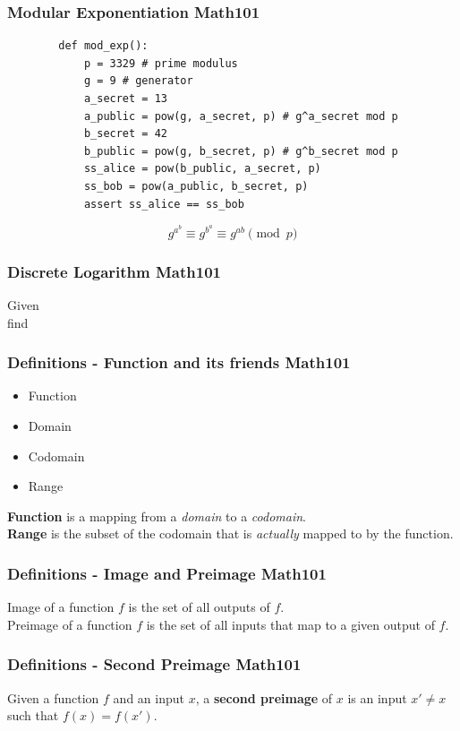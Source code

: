\documentclass[12pt]{beamer}
\newcommand{\FrameTitle}[2]{\frametitle{#1 \hfill \small\textnormal{\textcolor{midgray}{#2}}}}
\newcommand{\nl}{\vspace*{1em}\\}
\begin{document}
\begin{frame}[fragile]\FrameTitle{Modular Exponentiation}{Math101}
    \begin{lstlisting}
        def mod_exp():
            p = 3329 # prime modulus
            g = 9 # generator
            a_secret = 13
            a_public = pow(g, a_secret, p) # g^a_secret mod p
            b_secret = 42
            b_public = pow(g, b_secret, p) # g^b_secret mod p
            ss_alice = pow(b_public, a_secret, p)
            ss_bob = pow(a_public, b_secret, p)
            assert ss_alice == ss_bob
    \end{lstlisting}

    {\Large
    $$
        g^{a^{b}} \equiv g^{b^{a}} \equiv g^{ab}  \pmod{p}
    $$
    }
\end{frame}

\begin{frame}\FrameTitle{Discrete Logarithm}{Math101}
    {\huge
    Given
     \nl
    find \color{Apricot}{$a$}
    }
\end{frame}

\begin{frame}\FrameTitle{Definitions - Function and its friends}{Math101}
    \begin{itemize}
        \item[] Function
        \item[] Domain
        \item[] Codomain
        \item[] Range
    \end{itemize}

    \textbf{Function} is a mapping from a \textit{domain} to a \textit{codomain}.\nl
    \textbf{Range} is the subset of the codomain that is \textit{actually} mapped to by the function.
\end{frame}

\begin{frame}\FrameTitle{Definitions - Image and Preimage}{Math101}
    Image of a function $f$ is the set of all outputs of $f$.\nl
    Preimage of a function $f$ is the set of all inputs that map to a given output of $f$.
\end{frame}

\begin{frame}\FrameTitle{Definitions - Second Preimage}{Math101}
    Given a function $f$ and an input $x$, a \textbf{second preimage} of $x$ is an input $x' \neq x$ such that $f(x) = f(x')$.
\end{frame}
\end{document}

